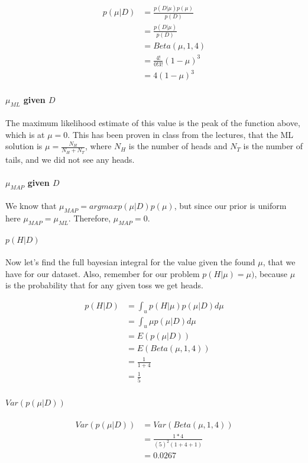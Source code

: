 \documentclass[paper=a4, fontsize=11pt]{scrartcl} %
\begin{document}
\begin{align}
p(\mu|D) &= \frac{p(D|\mu)p(\mu)}{p(D)} \\
&= \frac{p(D|\mu)}{p(D)} \\
&= Beta(\mu,1,4) \\
&= \frac{4!}{0!3!}(1-\mu)^3 \\
& = 4 (1-\mu)^3
\end{align}

\paragraph{$\mu_{ML}$ given $D$}
The maximum likelihood estimate of this value is the peak of the function above, which is at $\mu = 0$.
This has been proven in class from the lectures, that the ML solution is  $\mu = \frac{N_H}{N_H+N_T}$, where $N_H$ is the number of heads and $N_T$ is the number of tails, and we did not see any heads.

\paragraph{$\mu_{MAP}$ given $D$}
We know that $\mu_{MAP} = argmax p(\mu|D)p(\mu)$, but since our prior is uniform here $\mu_{MAP} = \mu_{ML}$.  Therefore, $\mu_{MAP} = 0$.

\paragraph{$p(H|D)$}
Now let's find the full bayesian integral for the value given the found $\mu$, that we have for our dataset.  Also, remember for our problem $p(H|\mu) = \mu)$, because $\mu$ is the probability that for any given toss we get heads.

\begin{align}
p(H|D) &= \int_u p(H|\mu)p(\mu|D)d\mu \\
&= \int_u \mu p(\mu|D)d\mu \\
&= E( p(\mu|D)) \\
&= E( Beta(\mu,1,4)) \\
&= \frac{1}{1+4} \\
&= \frac{1}{5} \\
\end{align}

\paragraph{$Var(p(\mu|D))$}

\begin{align}
Var(p(\mu|D)) &=  Var(Beta(\mu,1,4)) \\
&= \frac{1*4}{(5)^2(1+4+1)} \\
&= 0.0267
\end{align}
\end{document}
